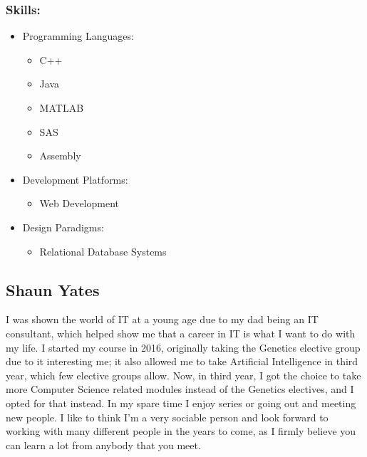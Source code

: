 \documentclass[12pt]{article}
\begin{document}
	\subsubsection{Skills:}
	\begin{itemize}
	\item Programming Languages:
	\begin{itemize}
	\item C++
	\item Java
	\item MATLAB
	\item SAS
	\item Assembly
	\end{itemize}
	\item Development Platforms:
	\begin{itemize}
	\item Web Development
	\end{itemize}
	\item Design Paradigms:
	\begin{itemize}
	\item Relational Database Systems
	\end{itemize}
	\end{itemize}
	
	\subsection{Shaun Yates}
	I was shown the world of IT at a young age due to my dad being an IT consultant, which helped show me that a career in IT is what I want to do with my life. I started my course in 2016, originally taking the Genetics elective group due to it interesting me; it also allowed me to take Artificial Intelligence in third year, which few elective groups allow. Now, in third year, I got the choice to take more Computer Science related modules instead of the Genetics electives, and I opted for that instead. In my spare time I enjoy series or going out and meeting new people. I like to think I'm a very sociable person and look forward to working with many different people in the years to come, as I firmly believe you can learn a lot from anybody that you meet.
	
\end{document}
